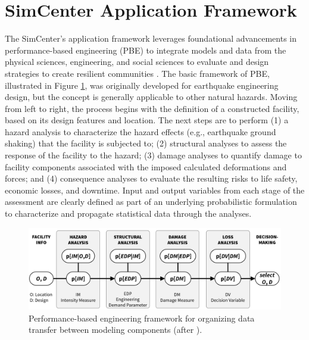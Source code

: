 \section{SimCenter Application Framework}

The SimCenter’s application framework leverages foundational advancements in performance-based engineering (PBE) to integrate models and data from the physical sciences, engineering, and social sciences to evaluate and design strategies to create resilient communities \citep{deierlein2020cloud}.  The basic framework of PBE, illustrated in Figure \ref{fig:intro_PBE_framework}, was originally developed for earthquake engineering design, but the concept is generally applicable to other natural hazards.  Moving from left to right, the process begins with the definition of a constructed facility, based on its design features and location. The next steps are to perform (1) a hazard analysis to characterize the hazard effects (e.g., earthquake ground shaking) that the facility is subjected to; (2) structural analyses to assess the response of the facility to the hazard; (3) damage analyses to quantify damage to facility components associated with the imposed calculated deformations and forces; and (4) consequence analyses to evaluate the resulting risks to life safety, economic losses, and downtime.  Input and output variables from each stage of the assessment are clearly defined as part of an underlying probabilistic formulation to characterize and propagate statistical data through the analyses.

\begin{figure}[htb]
    \centering
    \includegraphics[width=1.0\textwidth, angle = 0]{Figures/PBE_framework.pdf}
    \caption{Performance-based engineering framework for organizing data transfer between modeling components (after \cite{porter2003overview}).}
    \label{fig:intro_PBE_framework}
\end{figure}

